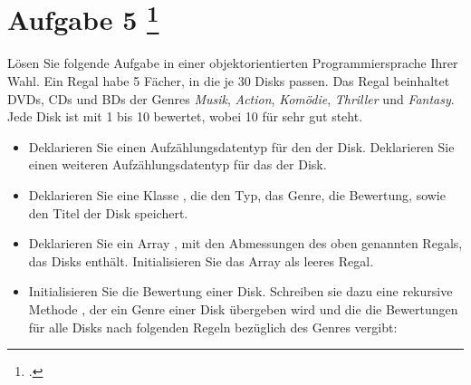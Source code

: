 \documentclass{lehramt-informatik-aufgabe}
\begin{document}
\section{Aufgabe 5
\footcite{examen:66116:2014:09}}

Lösen Sie folgende Aufgabe in einer objektorientierten
Programmiersprache Ihrer Wahl. Ein Regal habe 5 Fächer, in die je 30
Disks passen. Das Regal beinhaltet DVDs, CDs und BDs der Genres
\emph{Musik}, \emph{Action}, \emph{Komödie}, \emph{Thriller} und
\emph{Fantasy}. Jede Disk ist mit 1 bis 10 bewertet, wobei 10 für sehr
gut steht.

\begin{itemize}

%

\item Deklarieren Sie einen Aufzählungsdatentyp für den 
der Disk. Deklarieren Sie einen weiteren Aufzählungsdatentyp für das
 der Disk.

\begin{liAntwort}
\end{liAntwort}

%

\item Deklarieren Sie eine Klasse , die den Typ, das
Genre, die Bewertung, sowie den Titel der Disk speichert.

\begin{liAntwort}
\end{liAntwort}

%

\item Deklarieren Sie ein Array , mit den Abmessungen
des oben genannten Regals, das Disks enthält. Initialisieren Sie das
Array als leeres Regal.

\begin{liAntwort}
\end{liAntwort}

%

\item Initialisieren Sie die Bewertung einer Disk. Schreiben sie dazu
eine rekursive Methode , der ein Genre
einer Disk übergeben wird und die die Bewertungen für alle Disks nach
folgenden Regeln bezüglich des Genres vergibt:


\end{itemize}
\end{document}
